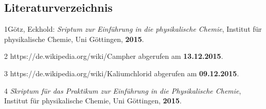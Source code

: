 \documentclass[12pt,a4paper,titlepage,headinclude,bibtotoc]{scrartcl}
\begin{document}
 


 














\newpage



\subsection{Literaturverzeichnis}
1\quad Götz, Eckhold: \emph{Sriptum zur Einführung in die physikalische Chemie}, Institut für physikalische Chemie, Uni Göttingen, \textbf{2015}.

\vspace{0,5 cm}

2 \quad https://de.wikipedia.org/wiki/Campher abgerufen am \textbf{13.12.2015}.

\vspace{0,5cm}

3 \quad https://de.wikipedia.org/wiki/Kaliumchlorid abgerufen am \textbf{09.12.2015}.

\vspace{0,5cm}

4 \quad \emph{Skriptum für das Praktikum zur Einführung in die Physikalische Chemie}, Institut für physikalische Chemie, Uni Göttingen, \textbf{2015}.\\
\end{document}

